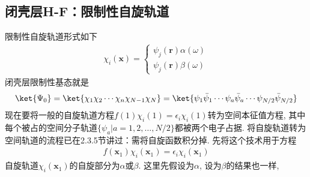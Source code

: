 \subsection{闭壳层H-F：限制性自旋轨道}\label{sec3.4.1}
限制性自旋轨道形式如下
\begin{align}\label{3.110}
	\chi_i(\mathbf{x}) =
	\begin{cases*}
		\psi_j(\mathbf{r})\alpha(\omega)\\
		\psi_j(\mathbf{r})\beta(\omega)
	\end{cases*}
\end{align}
闭壳层限制性基态就是
\begin{align}\label{3.111}
	\ket{\Psi_0} = \ket{\chi_1\chi_2\cdots\chi_n\chi_{N-1}\chi_N} = \ket{\psi_1\bar{\psi}_1\cdots\psi_a\bar{\psi}_a\cdots\psi_{N/2}\bar{\psi}_{N/2}}
\end{align}
现在要将一般的自旋轨道\hft 方程$f(1)\chi_i(1)=\epsilon_i\chi_i(1)$转为空间本征值方程, 
其中每个被占的空间分子轨道$\{\psi_a|a=1,2,\ldots,N/2\}$都被两个电子占据. 
将自旋轨道转为空间轨道的流程已在2.3.5节讲过：需将自旋函数积分掉. 
先将这个技术用于\hft 方程
\begin{align}\label{3.112}
	f(\mathbf{x}_1)\chi_i(\mathbf{x}_1) = \epsilon_i\chi_i(\mathbf{x}_1)
\end{align}
自旋轨道$\chi_i(\mathbf{x}_1)$的自旋部分为$\alpha$或$\beta$. 
这里先假设为$\alpha$, 
设为$\beta$的结果也一样,

